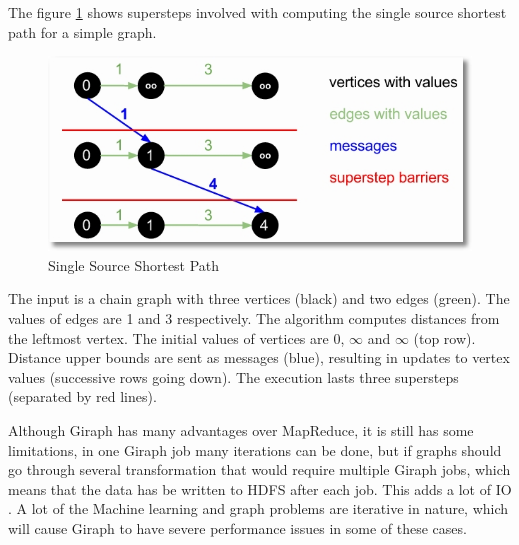 \documentclass[english]{tktltiki}
\begin{document}
The figure \ref{fig:sssp} shows supersteps involved with computing the single source shortest path for a simple graph.
\begin{figure}[ht!]
\centering
\includegraphics[width=130mm]{figures/giraphsuperstep.jpg}
\caption{Single Source Shortest Path}
\label{fig:sssp}
\end{figure}

The input is a chain graph with three vertices (black) and two edges (green). The values of edges are 1 and 3 respectively. The algorithm computes distances from the leftmost vertex. The initial values of vertices are 0, $\infty$ and $\infty$ (top row). Distance upper bounds are sent as messages (blue), resulting in updates to vertex values (successive rows going down). The execution lasts three supersteps (separated by red lines).

Although Giraph has many advantages over MapReduce, it is still has some limitations, in one Giraph job many iterations can be done, but if graphs should go through several transformation that would require multiple Giraph jobs, which means that the data has be written to HDFS after each job. This adds a lot of IO . A lot of the Machine learning and graph problems are iterative in nature, which will cause Giraph to have severe performance issues in some of these cases. 
\end{document}
